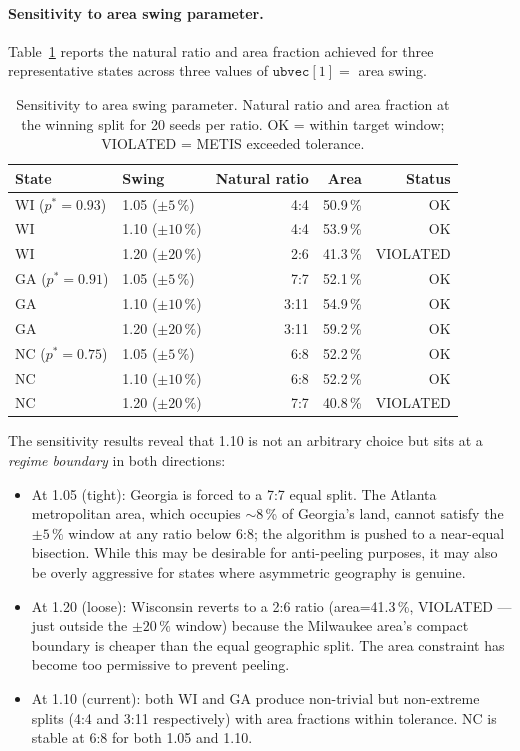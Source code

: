 \paragraph{Sensitivity to area swing parameter.}
Table~\ref{tab:swing-sensitivity} reports the natural ratio and area fraction
achieved for three representative states across three values of
$\mathtt{ubvec}[1] = $ area swing.

\begin{table}[h]
\centering
\caption{Sensitivity to area swing parameter.
Natural ratio and area fraction at the winning split for 20 seeds per ratio.
OK = within target window; VIOLATED = METIS exceeded tolerance.}
\label{tab:swing-sensitivity}
\begin{tabular}{llrrr}
\toprule
State & Swing & Natural ratio & Area & Status \\
\midrule
WI ($p^* = 0.93$) & 1.05 ($\pm 5\,\%$) & 4:4 & 50.9\,\% & OK \\
WI & 1.10 ($\pm 10\,\%$) & 4:4 & 53.9\,\% & OK \\
WI & 1.20 ($\pm 20\,\%$) & 2:6 & 41.3\,\% & VIOLATED \\
\midrule
GA ($p^* = 0.91$) & 1.05 ($\pm 5\,\%$) & 7:7 & 52.1\,\% & OK \\
GA & 1.10 ($\pm 10\,\%$) & 3:11 & 54.9\,\% & OK \\
GA & 1.20 ($\pm 20\,\%$) & 3:11 & 59.2\,\% & OK \\
\midrule
NC ($p^* = 0.75$) & 1.05 ($\pm 5\,\%$) & 6:8 & 52.2\,\% & OK \\
NC & 1.10 ($\pm 10\,\%$) & 6:8 & 52.2\,\% & OK \\
NC & 1.20 ($\pm 20\,\%$) & 7:7 & 40.8\,\% & VIOLATED \\
\bottomrule
\end{tabular}
\end{table}

The sensitivity results reveal that 1.10 is not an arbitrary choice but sits
at a \emph{regime boundary} in both directions:

\begin{itemize}
\item At 1.05 (tight): Georgia is forced to a 7:7 equal split.
  The Atlanta metropolitan area, which occupies $\sim$8\,\% of Georgia's land,
  cannot satisfy the $\pm 5\,\%$ window at any ratio below 6:8; the algorithm
  is pushed to a near-equal bisection.
  While this may be desirable for anti-peeling purposes, it may also be
  overly aggressive for states where asymmetric geography is genuine.

\item At 1.20 (loose): Wisconsin reverts to a 2:6 ratio
  (area=41.3\,\%, VIOLATED — just outside the $\pm 20\,\%$ window) because the
  Milwaukee area's compact boundary is cheaper than the equal geographic split.
  The area constraint has become too permissive to prevent peeling.

\item At 1.10 (current): both WI and GA produce non-trivial but non-extreme splits
  (4:4 and 3:11 respectively) with area fractions within tolerance.
  NC is stable at 6:8 for both 1.05 and 1.10.
\end{itemize}

